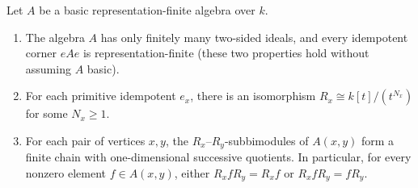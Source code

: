 \begin{lemma}
\label{lem:endpoint-chains}
Let $A$ be a basic representation-finite algebra over $k$.
\begin{enumerate}[label={\upshape(\arabic*)}]
\item The algebra $A$ has only finitely many two-sided ideals, and every
idempotent corner $eAe$ is representation-finite (these two properties hold
without assuming $A$ basic).
\item For each primitive idempotent $e_x$, there is an isomorphism
$R_x\cong k[t]/(t^{N_x})$ for some $N_x\geq1$.
\item For each pair of vertices $x,y$, the $R_x$--$R_y$-subbimodules of
$A(x,y)$ form a finite chain with one-dimensional successive quotients. In
particular, for every nonzero element $f\in A(x,y)$, either
$R_xfR_y=R_xf$ or $R_xfR_y=fR_y$.
\end{enumerate}
\end{lemma}
